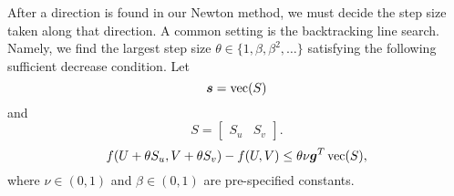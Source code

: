 After a direction is found in our Newton method, we must decide the step size taken along that direction. A common setting is the backtracking line search. Namely, we find the largest step size $\theta\in\{1,\beta,\beta^2,\dots\}$ satisfying the following sufficient decrease condition.
Let 
\begin{equation}
\boldsymbol{s} = \operatorname*{vec}(S)
\label{eq:s}
\end{equation} 
and 
\begin{equation}
S = \begin{bmatrix} S_u & S_v \end{bmatrix}
\label{eq:susv}.
\end{equation}  
\begin{equation}
    f(U+\theta S_{u},V+\theta S_{v}) - f(U,V) \le \theta\nu {\ensuremath{\boldsymbol{g}}}^T\operatorname*{vec}(S),
    \label{eq:LineSearchRule}
\end{equation}
where $\nu\in(0,1)$ and $\beta\in(0,1)$ are pre-specified constants.